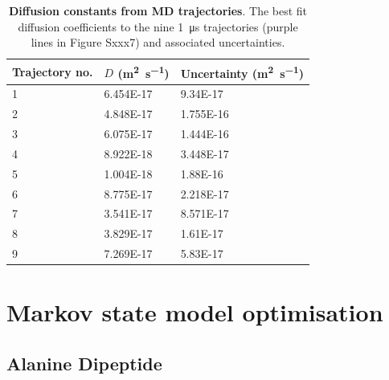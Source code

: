 \begin{table}
    \centering
    \caption{\textbf{Diffusion constants from MD trajectories}. The best fit diffusion coefficients to the nine \SI{1}{\micro\second} trajectories (purple lines in Figure Sxxx7) and associated uncertainties.}
    \begin{tabular}{|l|l|l|}
    \hline
    Trajectory no. & $D$ (\si{\meter\squared\per\second}) & Uncertainty  (\si{\meter\squared\per\second})  \\
    \hline
    1 &	6.454E-17	& 9.34E-17 \\
    2 &	4.848E-17	& 1.755E-16 \\
    3 &	6.075E-17	& 1.444E-16 \\
    4 &	8.922E-18	& 3.448E-17 \\
    5 &	1.004E-18	& 1.88E-16 \\
    6 &	8.775E-17	& 2.218E-17 \\
    7 &	3.541E-17	& 8.571E-17 \\
    8 &	3.829E-17	& 1.61E-17 \\
    9 &	7.269E-17	& 5.83E-17 \\
    \hline
    \end{tabular}
    \label{tab:wat_s2}
\end{table}


\chapter{Markov state model optimisation}\label{app:msm}

\section{Alanine Dipeptide}

